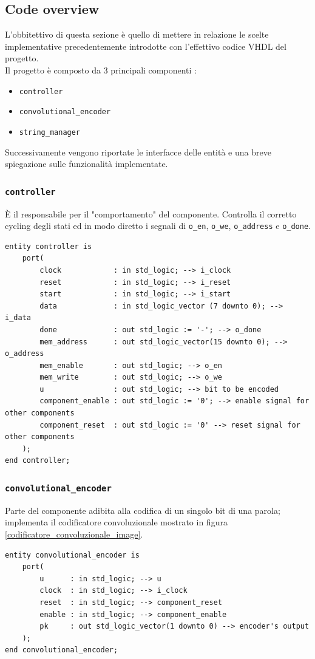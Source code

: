 \documentclass[11pt,a4paper]{article}
\begin{document}
        \subsection{Code overview}
            L'obbitettivo di questa sezione è quello di mettere in relazione le scelte implementative precedentemente introdotte con l'effettivo codice VHDL del progetto.\\
            Il progetto è composto da 3 principali componenti :
            \begin{itemize}
                \item \texttt{controller}
                \item \texttt{convolutional\_encoder}
                \item \texttt{string\_manager}
            \end{itemize}
            Successivamente vengono riportate le interfacce delle entità e una breve spiegazione sulle funzionalità implementate.
            \subsubsection{\texttt{controller}}
            È il responsabile per il "comportamento" del componente. Controlla il corretto cycling degli stati ed in modo diretto i segnali di \texttt{o\_en}, \texttt{o\_we}, \texttt{o\_address} e \texttt{o\_done}. 
                \begin{verbatim}
entity controller is
    port(
        clock            : in std_logic; --> i_clock
        reset            : in std_logic; --> i_reset
        start            : in std_logic; --> i_start
        data             : in std_logic_vector (7 downto 0); --> i_data
        done             : out std_logic := '-'; --> o_done
        mem_address      : out std_logic_vector(15 downto 0); --> o_address
        mem_enable       : out std_logic; --> o_en
        mem_write        : out std_logic; --> o_we
        u                : out std_logic; --> bit to be encoded
        component_enable : out std_logic := '0'; --> enable signal for other components
        component_reset  : out std_logic := '0' --> reset signal for other components
    );
end controller;
                \end{verbatim}
            \subsubsection{\texttt{convolutional\_encoder}}
                Parte del componente adibita alla codifica di un singolo bit di una parola; implementa il codificatore convoluzionale mostrato in figura \ref{codificatore_convoluzionale_image}.
                \begin{verbatim}
entity convolutional_encoder is 
    port(
        u      : in std_logic; --> u
        clock  : in std_logic; --> i_clock
        reset  : in std_logic; --> component_reset
        enable : in std_logic; --> component_enable
        pk     : out std_logic_vector(1 downto 0) --> encoder's output
    );
end convolutional_encoder;
                \end{verbatim}
\end{document}

